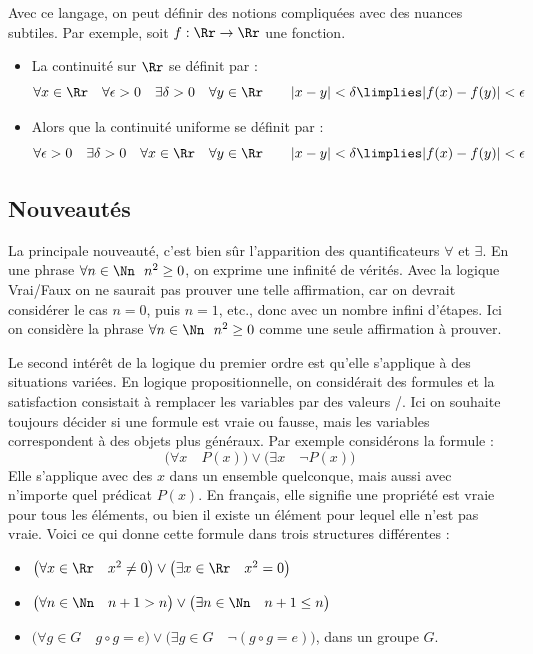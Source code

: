 \documentclass[11pt,class=report,crop=false]{standalone}
\begin{document}
Avec ce langage, on peut définir des notions compliquées avec des nuances subtiles. Par exemple, soit $f : \Rr \to \Rr$ une fonction.
\begin{itemize}
	\item La continuité sur $\Rr$ se définit par :
	\[
	\forall x \in \Rr \quad  \forall \epsilon > 0 \quad \exists \delta > 0 \quad \forall y \in \Rr
	\qquad  |x-y| < \delta \limplies |f(x)-f(y)| < \epsilon
	\]
	
	\item Alors que la continuité uniforme se définit par :
	\[
	\forall \epsilon > 0 \quad \exists \delta > 0 \quad \forall x \in \Rr \quad \forall y \in \Rr
	\qquad  |x-y| < \delta \limplies |f(x)-f(y)| < \epsilon
	\]	

\end{itemize}


\subsection{Nouveautés}

La principale nouveauté, c'est bien sûr l'apparition des quantificateurs \og{}$\forall$\fg{} et \og{}$\exists$\fg{}. En une phrase \og{}$\forall n \in \Nn \ \ n^2 \ge 0$\fg{}, on exprime une infinité de vérités.
Avec la logique Vrai/Faux on ne saurait pas prouver une telle affirmation, car on devrait considérer le cas $n=0$, puis $n=1$, etc., donc avec un nombre infini d'étapes. Ici on considère la phrase \og{}$\forall n \in \Nn \ \ n^2 \ge 0$\fg{} comme une seule affirmation à prouver.

\medskip

Le second intérêt de la logique du premier ordre est qu'elle s'applique à des situations variées.
En logique propositionnelle, on considérait des formules et la satisfaction consistait à remplacer les variables par des valeurs \ltrue/\lfalse.
Ici on souhaite toujours décider si une formule est vraie ou fausse, mais 
les variables correspondent à des objets plus généraux. Par exemple considérons la formule :
\[
\big( \forall x \quad P(x)\big) \lor \big( \exists x \quad \lnot P(x)\big)
\]
Elle s'applique avec des $x$ dans un ensemble quelconque, mais aussi avec n'importe quel prédicat $P(x)$. En français, elle signifie \og{}une propriété est vraie pour tous les éléments, ou bien il existe un élément pour lequel elle n'est pas vraie\fg{}.
Voici ce qui donne cette formule dans trois structures différentes :
\begin{itemize}
	\item $\big( \forall x \in \Rr \quad x^2 \neq 0\big) \lor \big( \exists x \in \Rr \quad x^2 = 0\big)$
	
	\item $\big( \forall n \in \Nn \quad n+1>n\big) \lor \big( \exists n \in \Nn \quad n+1 \le n\big)$
	
	\item $\big( \forall g \in G \quad g \circ g = e\big) \lor \big( \exists g \in G \quad \lnot (g\circ g = e) \big)$, dans un groupe $G$.
\end{itemize}
\end{document}
